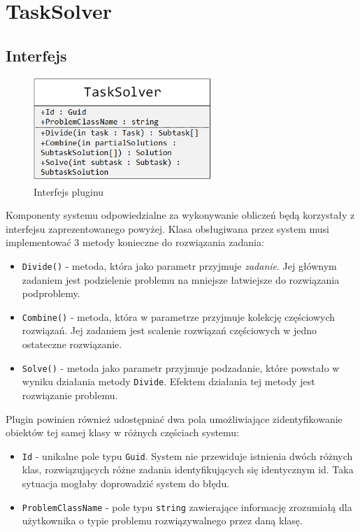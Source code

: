 \documentclass[12pt,a4paper,titlepage]{report}
\begin{document}
		
	\chapter{TaskSolver}
		\section{Interfejs}	
	\begin{figure}[h]
		\centering
		\caption{Interfejs pluginu}
		\includegraphics[width=0.6\textwidth]{img/taskSolverInterface.png}
	\end{figure}
	
	Komponenty systemu odpowiedzialne za wykonywanie obliczeń będą korzystały z interfejsu zaprezentowanego powyżej.
	Klasa obsługiwana przez system musi implementować 3 metody konieczne do rozwiązania zadania:
	\begin{itemize}
		\item \verb+Divide()+ - metoda, która jako parametr przyjmuje \textit{zadanie}. Jej głównym zadaniem
		 jest podzielenie problemu
		na mniejsze łatwiejsze do rozwiązania podproblemy.
		\item \verb+Combine()+ - metoda, która w parametrze przyjmuje kolekcję częściowych rozwiązań. Jej zadaniem
		jest scalenie rozwiązań częściowych w jedno ostateczne rozwiązanie.
		\item \verb+Solve()+ - metoda jako parametr przyjmuje podzadanie, które powstało w wyniku działania metody \verb+Divide+. 
		Efektem działania tej metody jest rozwiązanie problemu.
	\end{itemize}		
	
	Plugin powinien również udostępniać dwa pola umożliwiające zidentyfikowanie obiektów tej samej klasy
	w różnych częściach systemu:
	\begin{itemize}
		\item \verb+Id+ - unikalne pole typu \verb+Guid+. System nie przewiduje istnienia dwóch różnych klas,
		rozwiązujących różne zadania identyfikujących się identycznym id. Taka sytuacja mogłaby doprowadzić system do błędu.
		\item \verb+ProblemClassName+ - pole typu \verb+string+ zawierające informację zrozumiałą dla użytkownika
		o typie problemu rozwiązywalnego przez daną klasę.
	\end{itemize}		
\end{document}
